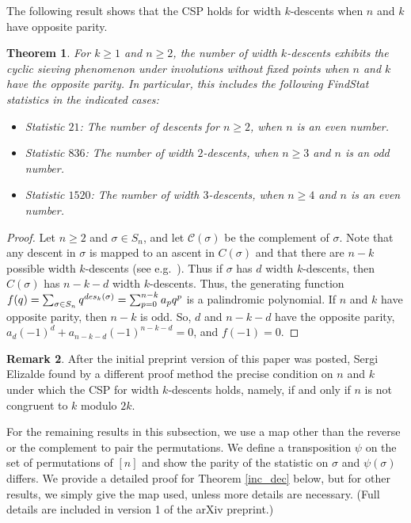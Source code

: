 \documentclass{amsart}
\newtheorem{thm}{Theorem}[section]
\theoremstyle{definition}
\newtheorem{remark}[thm]{Remark}
\newcommand{\des}{\textnormal{des}}
\begin{document}
The following result shows that the CSP holds for width $k$-descents when $n$ and $k$ have opposite parity. 
\begin{thm}\label{strict_3_des}
  For $k \geq 1$ and $n\geq 2$, the number of width $k$-descents exhibits the cyclic sieving phenomenon under involutions without fixed points when $n$ and $k$ have the opposite parity. In particular, this includes the following FindStat statistics in the indicated cases:
  \begin{itemize}
    \item Statistic $21$: The number of descents for $n\geq 2$, when $n$ is an even number.
    \item Statistic $836$: The number of width $2$-descents, when $n\geq 3$ and $n$ is an odd number.
    \item Statistic $1520$: The number of width $3$-descents, when $n\geq 4$ and $n$ is an even number.
  \end{itemize}
\end{thm}


\begin{proof}
  Let $n\geq 2$ and $\sigma \in S_n$, and let $\mathcal{C}(\sigma)  $ be the complement of $\sigma$. 
  Note that any descent in $\sigma$ is mapped to an ascent in $C(\sigma)$ and that there are $n-k$ possible width $k$-descents (see e.g.~\cite[Prop 5.26-5.27]{ELMSW22}). 
  Thus if $\sigma$ has $d$ width $k$-descents, then $C(\sigma)$ has $n-k - d$ width $k$-descents.
  Thus, the generating function
$f(q) = \sum_{\sigma \in S_n} q^{\des_k(\sigma)} = \sum_{p=0}^{n-k}a_pq^p$
  is a palindromic polynomial.
  If $n$ and $k$ have opposite parity, then $n-k$ is odd. So, $d$ and $n-k-d$ have the opposite parity, $a_d(-1)^d +a_{n-k-d}(-1)^{n-k-d} = 0$, and $f(-1)=0$.
\end{proof}

\begin{remark}
After the initial preprint version of this paper was posted, Sergi Elizalde found by a different proof method the precise condition on $n$ and $k$ under which the CSP for width $k$-descents holds, namely, if and only if $n$ is not congruent to $k$ modulo $2k$. 
\end{remark}


For the remaining results in this subsection, we use a map other than the reverse or the complement to pair the permutations. We define a transposition $\psi$ on the set of permutations of $[n]$ and show the parity of the statistic on $\sigma$ and $\psi(\sigma)$ differs. We provide a detailed proof for Theorem \ref{inc_dec} below, but for other results, we simply give the map used, unless more details are necessary. (Full details are included in version 1 of the arXiv preprint.)
\end{document}
